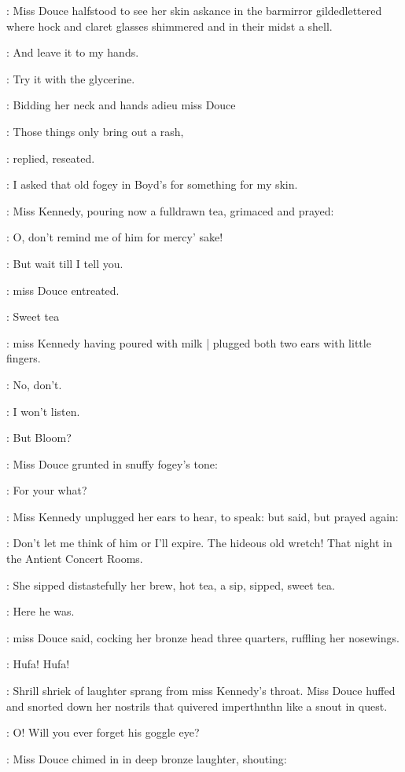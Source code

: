 :
Miss Douce halfstood to see her skin askance in the barmirror
gildedlettered where hock and claret glasses shimmered and in their midst
a shell.

\MissD:
And leave it to my hands.

\MissK:
Try it with the glycerine.

:
Bidding her neck and hands adieu miss Douce

\MissD:
Those things only bring out a rash,

:
replied, reseated.

\MissD:
I asked that
old fogey in Boyd's for something for my skin.

:
Miss Kennedy, pouring now a fulldrawn tea, grimaced and prayed:

\MissK:
O, don't remind me of him for mercy' sake!

\MissD:
But wait till I tell you.

:
miss Douce entreated.

\MissK:
Sweet tea

:
miss Kennedy having poured with milk |
plugged both two ears
with little fingers.

\MissK:
No, don't.

\MissK:
I won't listen.

:
But Bloom?

:
Miss Douce grunted in snuffy fogey's tone:

\MissD:
For your what?

:
Miss Kennedy unplugged her ears to hear, to speak: but said, but
prayed again:

\MissK:
Don't let me think of him or I'll expire. The hideous old wretch! That
night in the Antient Concert Rooms.

:
She sipped distastefully her brew, hot tea,
a sip, sipped,
sweet tea.

\MissD:
Here he was.

:
miss Douce said, cocking her bronze head three quarters,
ruffling her nosewings.

\MissD:
Hufa! Hufa!

:
Shrill shriek of laughter sprang from miss Kennedy's throat. Miss
Douce huffed and snorted down her nostrils that quivered imperthnthn like
a snout in quest.

\MissK:
O!
Will you ever forget his goggle eye?

:
Miss Douce chimed in in deep bronze laughter, shouting:


